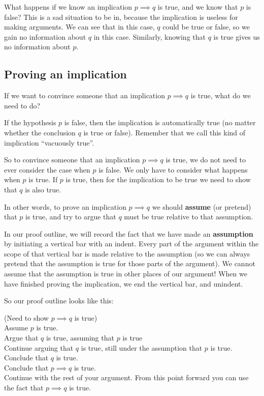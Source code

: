 \documentclass{article}
\begin{document}
What happens if we know an implication $p \implies q$ is true, and we know that $p$ is false?  This is a sad situation to be in, because the implication is useless for making arguments.  We can see that in this case, $q$ could be true or false, so we gain no information about $q$ in this case.  Similarly, knowing that $q$ is true gives us no information about $p$.

\subsection{Proving an implication}

If we want to convince someone that an implication $p \implies q$ is true, what do we need to do?

If the hypothesis $p$ is false, then the implication is automatically true (no matter whether the conclusion $q$ is true or false).  Remember that we call this kind of implication ``vacuously true''.  

So to convince someone that an implication $p \implies q$ is true, we do not need to ever consider the case when $p$ is false.  We only have to consider what happens when $p$ is true.  If $p$ is true, then for the implication to be true we need to show that $q$ is also true.

In other words, to prove an implication $p \implies q$ we should \textbf{assume} (or pretend) that $p$ is true, and try to argue that $q$ must be true relative to that assumption.

In our proof outline, we will record the fact that we have made an \textbf{assumption} by initiating a vertical bar with an indent.  Every part of the argument within the scope of that vertical bar is made relative to the assumption (so we can always pretend that the assumption is true for those parts of the argument).  We cannot assume that the assumption is true in other places of our argument!  When we have finished proving the implication, we end the vertical bar, and unindent.

 
\newpage

So our proof outline looks like this:


	\begin{fitch*}
		\textrm{(Need to show $p \implies q$ is true)}\\
		\textrm{Assume $p$ is true.}\\
		\fa \textrm{ Argue that $q$ is true, assuming that $p$ is true}\\
		\fa \textrm{ Continue arguing that $q$ is true, still under the assumption that $p$ is true.}\\
		\fa \textrm{ Conclude that $q$ is true.}\\
		\textrm{Conclude that $p \implies q$ is true.}\\
		\textrm{Continue with the rest of your argument.  From this point forward you can use the fact that $p \implies q$ is true.}\\
	\end{fitch*}
\end{document}

